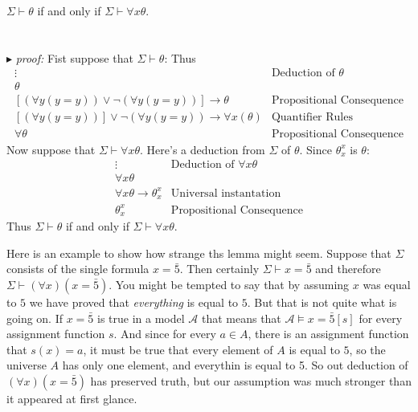 \documentclass[9pt,a4paper]{article}
\newcommand{\curveA}{\mathcal{A}}
\newcommand{\proof}{\ \\ \ \\ $\blacktriangleright$ \textit{proof: }}
\begin{document}
        \begin{lemma}
            $\Sigma\vdash \theta$ if and only if $\Sigma \vdash \forall x\theta$.\\
            \proof Fist suppose that $\Sigma \vdash \theta$: Thus 
            \begin{align}
                \vdots & \text{Deduction of } \theta \\ 
                \theta &  \ \\
                [(\forall y (y = y))\lor \neg(\forall y (y=y))]\rightarrow \theta & \text{Propositional Consequence}\\
                [(\forall y(y=y))]\lor \neg(\forall y (y=y)) \rightarrow \forall x(\theta) &\text{Quantifier Rules}\\
                \forall \theta & \text{Propositional Consequence}
            \end{align}
            Now suppose that $\Sigma \vdash\forall x\theta$. Here's a deduction from $\Sigma$ of $\theta$. Since $\theta_x^x$ is $\theta$:
            \begin{align}
                \vdots & \text{Deduction of } \forall x\theta\\
                \forall x\theta & \ \\
                \forall x\theta \rightarrow \theta_x^x & \text{Universal instantation}\\
                \theta_x^x & \text{Propositional Consequence}
            \end{align}
            Thus $\Sigma\vdash \theta$ if and only if $\Sigma \vdash \forall x\theta$.
        \end{lemma}
        Here is an example to show how strange ths lemma might seem. Suppose that $\Sigma$ consists of the single formula $x = \bar 5$. Then certainly $\Sigma \vdash x= \bar 5$ and therefore $\Sigma\vdash (\forall x) (x = \bar 5)$. You might be tempted to say that by assuming $x$ was equal to $5$ we have proved that \textit{everything} is equal to $5$. But that is not quite what is going on. If $x = \bar 5$ is true in a model $\curveA$ that means that $\curveA\vDash x = \bar5 [s]$ for every assignment function $s$. And since for every $a\in A$, there is an assignment function that $s(x) = a$, it must be true that every element of $A$ is equal to $5$, so the universe $A$ has only one element, and everythin is equal to 5. So out deduction of $(\forall x)(x=\bar 5)$ has preserved truth, but our assumption was much stronger than it appeared at first glance.
\end{document}
